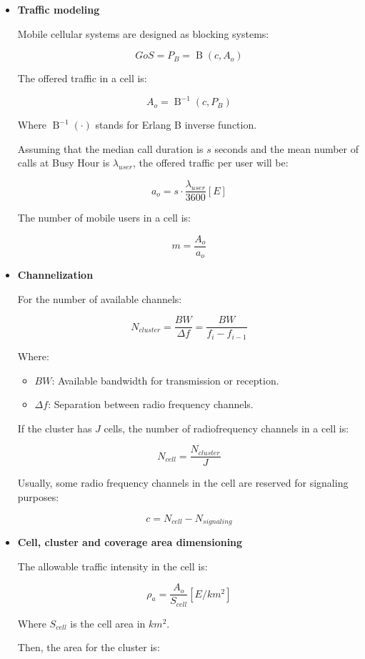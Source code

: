 \documentclass[../main.tex]{subfiles}
\begin{document}
\begin{itemize}
	\item {
		\textbf{Traffic modeling}

		Mobile cellular systems are designed as blocking systems:

		$$
			GoS = P_B = \operatorname{B}(c, A_o)
		$$

		The offered traffic in a cell is:

		$$
			A_o = \operatorname{B}^{-1} (c, P_B)
		$$
		
		Where $\operatorname{B}^{-1}(\cdot)$ stands for Erlang B inverse function.

		Assuming that the median call duration is $s$ seconds and the mean number of calls at Busy Hour is $\lambda_{user}$, the offered traffic per user will be:

		$$
			a_o = s \cdot \frac {\lambda_{user}} {3600} [E]
		$$

		The number of mobile users in a cell is:

		$$
			m = \frac {A_o} {a_o}
		$$
	}
	\item {
		\textbf{Channelization}

		For the number of available channels:

		$$
			N_{cluster} = \frac {BW} {\Delta f} = \frac {BW} {f_{i} -  f_{i-1}}
		$$

		Where:
		\begin{itemize}
			\item $BW$: Available bandwidth for transmission or reception.
			\item $\Delta f$: Separation between radio frequency channels.
		\end{itemize}

		If the cluster has $J$ cells, the number of radiofrequency channels in a cell is:

		$$
			N_{cell} = \frac {N_{cluster}} {J}
		$$

		Usually, some radio frequency channels in the cell are reserved for signaling purposes:

		$$
			c = N_{cell} - N_{signaling}
		$$
	}
	\item {
		\textbf{Cell, cluster and coverage area dimensioning}

		The allowable traffic intensity in the cell is:

		$$
			\rho_a = \frac {A_o} {S_{cell}} [E / km^2]
		$$

		Where $S_{cell}$ is the cell area in $km^2$.

		Then, the area for the cluster is:

}
\end{itemize}
\end{document}
